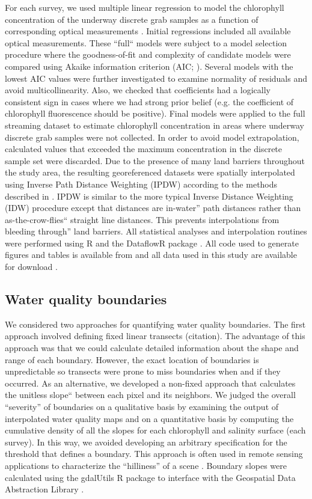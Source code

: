 \documentclass[review]{elsarticle}
\begin{document}
For each survey, we used multiple linear regression to model the chlorophyll concentration of the underway discrete grab samples as a function of corresponding optical measurements . Initial regressions included all available optical measurements. These “full“ models were subject to a model selection procedure where the goodness-of-fit and complexity of candidate models were compared using Akaike information criterion (AIC; ). Several models with the lowest AIC values were further investigated to examine normality of residuals and avoid multicollinearity. Also, we checked that coefficients had a logically consistent sign in cases where we had strong prior belief (e.g. the coefficient of chlorophyll fluorescence should be positive). 
Final models were applied to the full streaming dataset to estimate chlorophyll concentration in areas where underway discrete grab samples were not collected. In order to avoid model extrapolation, calculated values that exceeded the maximum concentration in the discrete sample set were discarded. Due to the presence of many land barriers throughout the study area, the resulting georeferenced datasets were spatially interpolated using Inverse Path Distance Weighting (IPDW) according to the methods described in . IPDW is similar to the more typical Inverse Distance Weighting (IDW) procedure except that distances are in-water” path distances rather than as-the-crow-flies“ straight line distances. This prevents interpolations from bleeding through” land barriers. All statistical analyses and interpolation routines were performed using R  and the DataflowR package . All code used to generate figures and tables is available from and all data used in this study are available for download .

\subsection{Water quality boundaries}

We considered two approaches for quantifying water quality boundaries. The first approach involved defining fixed linear transects (citation). The advantage of this approach was that we could calculate detailed information about the shape and range of each boundary. However, the exact location of boundaries is unpredictable so transects were prone to miss boundaries when and if they occurred. As an alternative, we developed a non-fixed approach that calculates the unitless slope“ between each pixel and its neighbors. We judged the overall “severity” of boundaries on a qualitative basis by examining the output of interpolated water quality maps and on a quantitative basis by computing the cumulative density of all the slopes for each chlorophyll and salinity surface (each survey). In this way, we avoided developing an arbitrary specification for the threshold that defines a boundary. This approach is often used in remote sensing applications to characterize the “hilliness” of a scene . Boundary slopes were calculated using the gdalUtils R package to interface with the Geospatial Data Abstraction Library .
\end{document}
